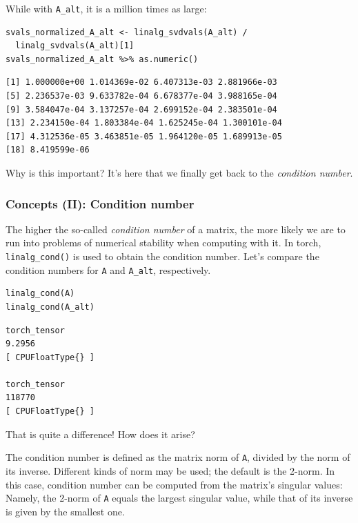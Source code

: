 \documentclass[
  letterpaper,
]{krantz}
\begin{document}
While with \texttt{A\_alt}, it is a million times as large:

\begin{verbatim}
svals_normalized_A_alt <- linalg_svdvals(A_alt) /
  linalg_svdvals(A_alt)[1]
svals_normalized_A_alt %>% as.numeric()
\end{verbatim}

\begin{verbatim}
[1] 1.000000e+00 1.014369e-02 6.407313e-03 2.881966e-03
[5] 2.236537e-03 9.633782e-04 6.678377e-04 3.988165e-04
[9] 3.584047e-04 3.137257e-04 2.699152e-04 2.383501e-04
[13] 2.234150e-04 1.803384e-04 1.625245e-04 1.300101e-04
[17] 4.312536e-05 3.463851e-05 1.964120e-05 1.689913e-05
[18] 8.419599e-06
\end{verbatim}

Why is this important? It's here that we finally get back to the
\emph{condition number}.

\hypertarget{concepts-ii-condition-number}{%
\subsubsection{\texorpdfstring{Concepts (II): Condition
number}{Concepts (II): Condition number}}\label{concepts-ii-condition-number}}

The higher the so-called \emph{condition number} of a matrix, the more
likely we are to run into problems of numerical stability when computing
with it. In torch, \texttt{linalg\_cond()} is used to obtain the
condition number. Let's compare the condition numbers for \texttt{A} and
\texttt{A\_alt}, respectively.

\begin{verbatim}
linalg_cond(A)
linalg_cond(A_alt)
\end{verbatim}

\begin{verbatim}
torch_tensor
9.2956
[ CPUFloatType{} ]

torch_tensor
118770
[ CPUFloatType{} ]
\end{verbatim}

That is quite a difference! How does it arise?

The condition number is defined as the matrix norm of
\texttt{A}, divided by the norm of its inverse. Different kinds of norm
may be used; the default is the 2-norm. In this case, condition number
can be computed from the matrix's singular
values: Namely, the 2-norm of \texttt{A}
equals the largest singular value, while that of its inverse is given by
the smallest one.
\end{document}
